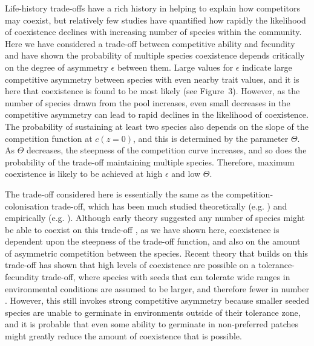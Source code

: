 Life-history trade-offs have a rich history in helping to explain how competitors may coexist, but relatively few studies have quantified how rapidly the likelihood of coexistence declines with increasing number of species within the community. Here we have considered a trade-off between competitive ability and fecundity and have shown the probability of multiple species coexistence depends critically on the degree of asymmetry $\epsilon$ between them. Large values for $\epsilon$ indicate large competitive asymmetry between species with even nearby trait values, and it is here that coexistence is found to be most likely (see Figure~3). However, as the number of species drawn from the pool increases, even small decreases in the competitive asymmetry can lead to rapid declines in the likelihood of coexistence. The probability of sustaining at least two species also depends on the slope of the competition function at $c(z=0)$, and this is determined by the parameter $\Theta$. As $\Theta$ decreases, the steepness of the competition curve increases, and so does the probability of the trade-off maintaining multiple species. Therefore, maximum coexistence is likely to be achieved at high $\epsilon$ and low $\Theta$.

The trade-off considered here is essentially the same as the competition-colonisation trade-off, which has been much studied theoretically (e.g.  \cite{levin1974disturbance, hastings1980disturbance, tilman1994competition}) and empirically (e.g. \cite{turnbull1999seed, robinson1995invasibility, cadotte2007competition}). Although early theory suggested any number of species might be able to coexist on this trade-off \cite{may1994superinfection, tilman1994competition}, as we have shown here, coexistence is dependent upon the steepness of the trade-off function, and also on the amount of asymmetric competition between the species. Recent theory that builds on this trade-off has shown that high levels of coexistence are possible on a tolerance-fecundity trade-off, where species with seeds that can tolerate wide ranges in environmental conditions are assumed to be larger, and therefore fewer in number \cite{muller2010tolerance}. However, this still invokes strong competitive asymmetry because smaller seeded species are unable to germinate in environments outside of their tolerance zone, and it is probable that even some ability to germinate in non-preferred patches might greatly reduce the amount of coexistence that is possible.

